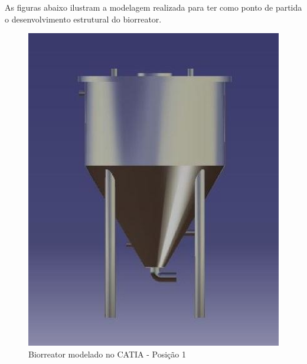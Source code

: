 As figuras abaixo ilustram a modelagem realizada para ter como ponto de partida o desenvolvimento estrutural do biorreator.

\begin{figure}[h]
	\centering
	\includegraphics[keepaspectratio=true,scale=0.5]{figuras/catia1.eps}
	\caption{Biorreator modelado no CATIA - Posição 1}
	\label{catia1}
\end{figure}

